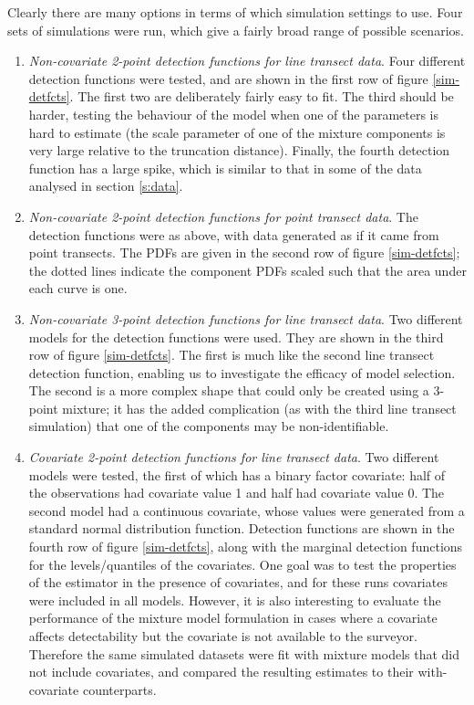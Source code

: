 Clearly there are many options in terms of which simulation settings to use. Four sets of simulations were run, which give a fairly broad range of possible scenarios.
\begin{enumerate}
	\item \textit{Non-covariate 2-point detection functions for line transect data}. Four different detection functions were tested, and are shown in the first row of figure \ref{sim-detfcts}. The first two are deliberately fairly easy to fit. The third should be harder, testing the behaviour of the model when one of the parameters is hard to estimate (the scale parameter of one of the mixture components is very large relative to the truncation distance). Finally, the fourth detection function has a large spike, which is similar to that in some of the data analysed in section \ref{s:data}.
	\item \textit{Non-covariate 2-point detection functions for point transect data}.  The detection functions were as above, with data generated as if it came from point transects. The PDFs are given in the second row of figure \ref{sim-detfcts}; the dotted lines indicate the component PDFs scaled such that the area under each curve is one.
	\item \textit{Non-covariate 3-point detection functions for line transect data}. Two different models for the detection functions were used. They are shown in the third row of figure \ref{sim-detfcts}. The first is much like the second line transect detection function, enabling us to investigate the efficacy of model selection. The second is a more complex shape that could only be created using a 3-point mixture; it has the added complication (as with the third line transect simulation) that one of the components may be non-identifiable.
	\item \textit{Covariate 2-point detection functions for line transect data}. Two different models were tested, the first of which has a binary factor covariate: half of the observations had covariate value 1 and half had covariate value 0. The second model had a continuous covariate, whose values were generated from a standard normal distribution function. Detection functions are shown in the fourth row of figure \ref{sim-detfcts}, along with the marginal detection functions for the levels/quantiles of the covariates. One goal was to test the properties of the estimator in the presence of covariates, and for these runs covariates were included in all models.  However, it is also interesting to evaluate the performance of the mixture model formulation in cases where a covariate affects detectability but the covariate is not available to the surveyor. Therefore the same simulated datasets were fit with mixture models that did not include covariates, and compared the resulting estimates to their with-covariate counterparts.
\end{enumerate}

